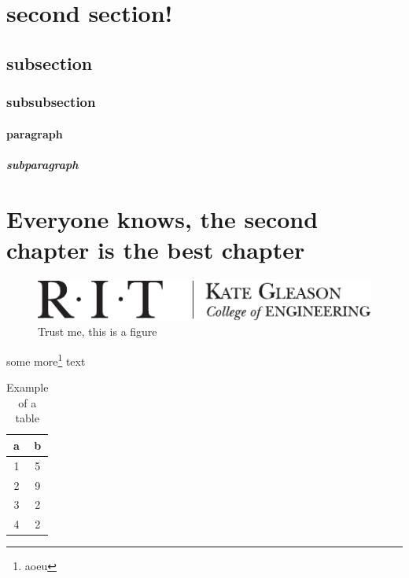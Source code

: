 \documentclass{ritthesis}
\providecommand{\chapter}[1]{\section{#1}}
\begin{document}
\section{second section!}

\subsection{subsection}

\subsubsection{subsubsection}

\paragraph{paragraph}

\subparagraph{subparagraph}

\lipsum{}
\chapter{Everyone knows, the second chapter is the best chapter}
\lipsum{}

\begin{figure}
\centering
\includegraphics{kgcoelogohoriz}
\caption{Trust me, this is a figure}
\label{fig:samp}
\end{figure}

some more\footnote{aoeu} text

\begin{table}
\centering
\caption{Example of a table}
\label{tab:samp}
\begin{tabular}{cc}
\toprule
a		& b\\
\midrule
1		& 5\\
2		& 9\\
3		& 2\\
4		& 2\\
\bottomrule
\end{tabular}
\end{table}
\end{document}
